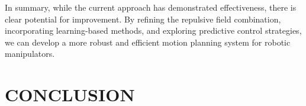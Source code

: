 \documentclass[letterpaper, 10 pt, conference]{ieeeconf}  %
\begin{document}
In summary, while the current approach has demonstrated effectiveness, there is clear potential for improvement. By refining the repulsive field combination, incorporating learning-based methods, and exploring predictive control strategies, we can develop a more robust and efficient motion planning system for robotic manipulators.

\section{CONCLUSION}

%

\end{document}
